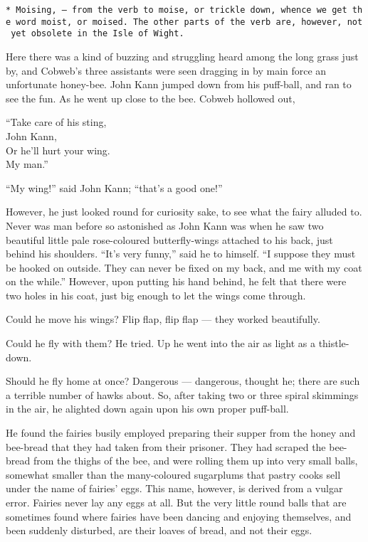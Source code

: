 \documentclass[
  12pt,
  a5paper,
  twoside]{book}
\let\oldtexttt\texttt        %
\renewcommand{\texttt}[1]{\footnotesize\oldtexttt{#1}}
\begin{document}
\texttt{*\ Moising,\ —\ from\ the\ verb\ to\ moise,\ or\ trickle\ down,\ whence\ we\ get\ the\ word\ moist,\ or\ moised.\ The\ other\ parts\ of\ the\ verb\ are,\ however,\ not\ yet\ obsolete\ in\ the\ Isle\ of\ Wight.}

Here there was a kind of buzzing and struggling heard among the long
grass just by, and Cobweb's three assistants were seen dragging in by
main force an unfortunate honey-bee. John Kann jumped down from his
puff-ball, and ran to see the fun. As he went up close to the bee.
Cobweb hollowed out,

``Take care of his sting,\\
John Kann,\\
Or he'll hurt your wing.\\
My man.''

``My wing!'' said John Kann; ``that's a good one!''

However, he just looked round for curiosity sake, to see what the fairy
alluded to. Never was man before so astonished as John Kann was when he
saw two beautiful little pale rose-coloured butterfly-wings attached to
his back, just behind his shoulders. ``It's very funny,'' said he to
himself. ``I suppose they must be hooked on outside. They can never be
fixed on my back, and me with my coat on the while.'' However, upon
putting his hand behind, he felt that there were two holes in his coat,
just big enough to let the wings come through.

Could he move his wings? Flip flap, flip flap --- they worked
beautifully.

Could he fly with them? He tried. Up he went into the air as light as a
thistle-down.

Should he fly home at once? Dangerous --- dangerous, thought he; there
are such a terrible number of hawks about. So, after taking two or three
spiral skimmings in the air, he alighted down again upon his own proper
puff-ball.

He found the fairies busily employed preparing their supper from the
honey and bee-bread that they had taken from their prisoner. They had
scraped the bee-bread from the thighs of the bee, and were rolling them
up into very small balls, somewhat smaller than the many-coloured
sugarplums that pastry cooks sell under the name of fairies' eggs. This
name, however, is derived from a vulgar error. Fairies never lay any
eggs at all. But the very little round balls that are sometimes found
where fairies have been dancing and enjoying themselves, and been
suddenly disturbed, are their loaves of bread, and not their eggs.
\end{document}
